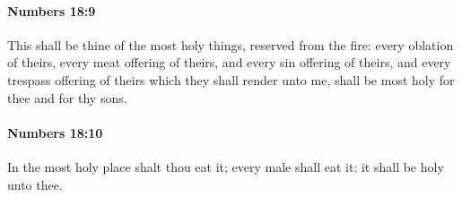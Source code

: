 		\paragraph{Numbers 18:9} %
			\label{NUMBERS-18-9}

			This shall be thine of the most holy things, reserved from the fire: every oblation of theirs, every meat offering of theirs, and every sin offering of theirs, and every trespass offering of theirs which they shall render unto me, shall be most holy for thee and for thy sons.


		\paragraph{Numbers 18:10} %
			\label{NUMBERS-18-10}

			In the most holy place shalt thou eat it; every male shall eat it: it shall be holy unto thee.


